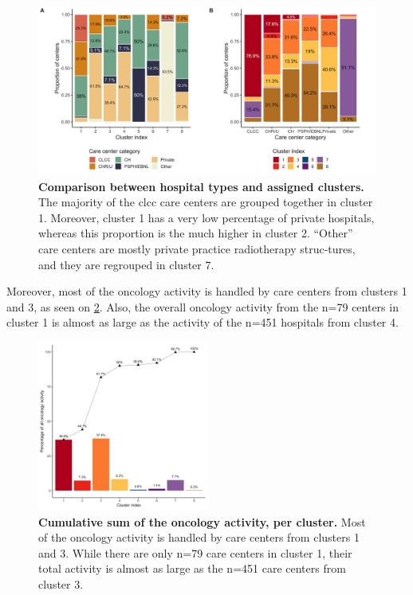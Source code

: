 \begin{figure}[H]
    \includegraphics[width=\textwidth]{images/camion/supplemental/sup_fig2_categories_per_cluster.png}
    \centering
    \caption{
        \textbf{Comparison between hospital types and assigned clusters.} The majority of the \ac{clcc} care centers are grouped together in cluster 1. Moreover, cluster 1 has a very low percentage of private hospitals, whereas this proportion is the much higher in cluster 2. “Other” care centers are mostly private practice radiotherapy struc-tures, and they are regrouped in cluster 7.
    }
    \label{fig:clustering-categories}
\end{figure}

Moreover, most of the oncology activity is handled by care centers from clusters 1 and 3, as seen on \cref{fig:clustering-cumulative}. Also, the overall oncology activity from the n=79 centers in cluster 1 is almost as large as the activity of the n=451 hospitals from cluster 4.

\begin{figure}[H]
    \includegraphics[width=0.5\textwidth]{images/camion/supplemental/sup_fig3_nb_stays_per_cluster.png}
    \centering
    \caption{
        \textbf{Cumulative sum of the oncology activity, per cluster.} Most of the oncology activity is handled by care centers from clusters 1 and 3. While there are only n=79 care centers in cluster 1, their total activity is almost as large as the n=451 care centers from cluster 3.
    }
    \label{fig:clustering-cumulative}
\end{figure}

